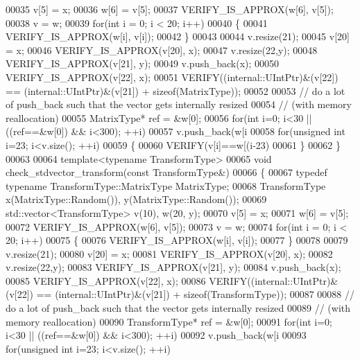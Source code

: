 \begin{DoxyCode}
00035   v[5] = x;
00036   w[6] = v[5];
00037   VERIFY\_IS\_APPROX(w[6], v[5]);
00038   v = w;
00039   \textcolor{keywordflow}{for}(\textcolor{keywordtype}{int} i = 0; i < 20; i++)
00040   \{
00041     VERIFY\_IS\_APPROX(w[i], v[i]);
00042   \}
00043 
00044   v.resize(21);
00045   v[20] = x;
00046   VERIFY\_IS\_APPROX(v[20], x);
00047   v.resize(22,y);
00048   VERIFY\_IS\_APPROX(v[21], y);
00049   v.push\_back(x);
00050   VERIFY\_IS\_APPROX(v[22], x);
00051   VERIFY((internal::UIntPtr)&(v[22]) == (internal::UIntPtr)&(v[21]) + \textcolor{keyword}{sizeof}(MatrixType));
00052 
00053   \textcolor{comment}{// do a lot of push\_back such that the vector gets internally resized}
00054   \textcolor{comment}{// (with memory reallocation)}
00055   MatrixType* ref = &w[0];
00056   \textcolor{keywordflow}{for}(\textcolor{keywordtype}{int} i=0; i<30 || ((ref==&w[0]) && i<300); ++i)
00057     v.push\_back(w[i%
00058   \textcolor{keywordflow}{for}(\textcolor{keywordtype}{unsigned} \textcolor{keywordtype}{int} i=23; i<v.size(); ++i)
00059   \{
00060     VERIFY(v[i]==w[(i-23)%
00061   \}
00062 \}
00063 
00064 \textcolor{keyword}{template}<\textcolor{keyword}{typename} TransformType>
00065 \textcolor{keywordtype}{void} check\_stdvector\_transform(\textcolor{keyword}{const} TransformType&)
00066 \{
00067   \textcolor{keyword}{typedef} \textcolor{keyword}{typename} TransformType::MatrixType MatrixType;
00068   TransformType x(MatrixType::Random()), y(MatrixType::Random());
00069   std::vector<TransformType> v(10), w(20, y);
00070   v[5] = x;
00071   w[6] = v[5];
00072   VERIFY\_IS\_APPROX(w[6], v[5]);
00073   v = w;
00074   \textcolor{keywordflow}{for}(\textcolor{keywordtype}{int} i = 0; i < 20; i++)
00075   \{
00076     VERIFY\_IS\_APPROX(w[i], v[i]);
00077   \}
00078 
00079   v.resize(21);
00080   v[20] = x;
00081   VERIFY\_IS\_APPROX(v[20], x);
00082   v.resize(22,y);
00083   VERIFY\_IS\_APPROX(v[21], y);
00084   v.push\_back(x);
00085   VERIFY\_IS\_APPROX(v[22], x);
00086   VERIFY((internal::UIntPtr)&(v[22]) == (internal::UIntPtr)&(v[21]) + \textcolor{keyword}{sizeof}(TransformType));
00087 
00088   \textcolor{comment}{// do a lot of push\_back such that the vector gets internally resized}
00089   \textcolor{comment}{// (with memory reallocation)}
00090   TransformType* ref = &w[0];
00091   \textcolor{keywordflow}{for}(\textcolor{keywordtype}{int} i=0; i<30 || ((ref==&w[0]) && i<300); ++i)
00092     v.push\_back(w[i%
00093   \textcolor{keywordflow}{for}(\textcolor{keywordtype}{unsigned} \textcolor{keywordtype}{int} i=23; i<v.size(); ++i)

\end{DoxyCode}
